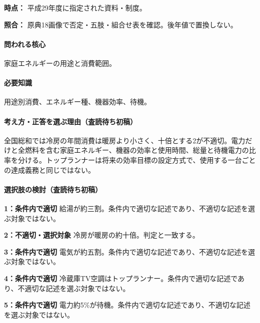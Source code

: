 \noindent\textbf{時点：} 平成29年度に指定された資料・制度。\par

\noindent\textbf{照合：} 原典18画像で否定・五肢・組合せ表を確認。後年値で置換しない。\par

\paragraph{問われる核心} 家庭エネルギーの用途と消費範囲。

\paragraph{必要知識} 用途別消費、エネルギー種、機器効率、待機。

\paragraph{考え方・正答を選ぶ理由（査読待ち初稿）} 全国総和では冷房の年間消費は暖房より小さく、十倍とする2が不適切。電力だけと全燃料を含む家庭エネルギー、機器の効率と使用時間、総量と待機電力の比率を分ける。トップランナーは将来の効率目標の設定方式で、使用する一台ごとの達成義務と同じではない。

\paragraph{選択肢の検討（査読待ち初稿）}\mbox{}\par

\noindent\textbf{1：条件内で適切} 給湯が約三割。条件内で適切な記述であり、不適切な記述を選ぶ対象ではない。\par

\noindent\textbf{2：不適切・選択対象} 冷房が暖房の約十倍。判定と一致する。\par

\noindent\textbf{3：条件内で適切} 電気が約五割。条件内で適切な記述であり、不適切な記述を選ぶ対象ではない。\par

\noindent\textbf{4：条件内で適切} 冷蔵庫TV空調はトップランナー。条件内で適切な記述であり、不適切な記述を選ぶ対象ではない。\par

\noindent\textbf{5：条件内で適切} 電力約5\%が待機。条件内で適切な記述であり、不適切な記述を選ぶ対象ではない。\par

